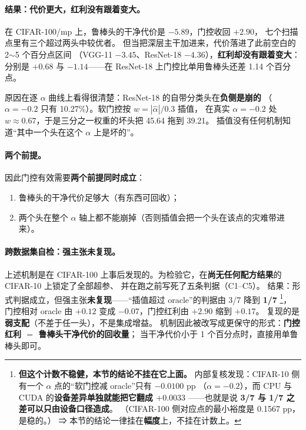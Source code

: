 \documentclass[11pt,a4paper]{ctexart}
\begin{document}
\paragraph{结果：代价更大，红利没有跟着变大。}
在 CIFAR-100/mp 上，鲁棒头的干净代价是 $-5.89$，门控收回 $+2.90$，
七个扫描点里有三个超过两头中较优者。
但当把深层主干加进来，代价落进了此前空白的 2$\sim$5 个百分点区间
（VGG-11 $-3.45$、ResNet-18 $-4.36$），\textbf{红利却没有跟着变大}：
分别是 $+0.68$ 与 $\mathbf{-1.14}$——在 ResNet-18 上门控比单用鲁棒头还差 1.14 个百分点。

原因在逐 $\alpha$ 曲线上看得很清楚：ResNet-18 的自带分类头在\textbf{负侧是崩的}
（$\alpha=-0.2$ 只有 10.27\%）。软门控按 $w=|\hat{\alpha}|/0.3$ 插值，
在真实 $\alpha=-0.2$ 处 $w\approx0.67$，于是三分之一权重的坏头把 45.64 拖到 39.21。
插值没有任何机制知道“其中一个头在这个 $\alpha$ 上是坏的”。

\paragraph{两个前提。}
因此门控有效需要\textbf{两个前提同时成立}：
\begin{enumerate}[leftmargin=2em,itemsep=2pt]
  \item 鲁棒头的干净代价足够大（有东西可回收）；
  \item 两个头在整个 $\alpha$ 轴上都不能崩掉（否则插值会把一个头在该点的灾难带进来）。
\end{enumerate}

\paragraph{跨数据集自检：强主张未复现。}
上述机制是在 CIFAR-100 上事后发现的。为检验它，在\textbf{尚无任何配方结果}的 CIFAR-10 上锁定了全部超参、
并在跑之前写死了五条判据（C1--C5）。
结果：形式判据成立，但强主张\textbf{未复现}——“插值超过 oracle”的判据由 3/7 降到 \textbf{1/7}
\footnote{\textbf{但这个计数不稳健，本节的结论不挂在它上面。}
内部复核发现：CIFAR-10 侧有一个 $\alpha$ 点的“软门控减 oracle”只有 $-0.0100$ pp
（$\alpha=-0.2$），而 CPU 与 CUDA 的\textbf{设备差异单独就能把它翻成 $+0.0033$}
——也就是说 \textbf{3/7 与 1/7 之差可以只由设备口径造成}。
（CIFAR-100 侧对应点的最小裕度是 0.1567 pp，是稳的。）
⇒ 本节的结论一律挂在\textbf{幅度}上，不挂在计数上。}，
门控相对 oracle 由 $+0.12$ 变成 $-0.07$，门控红利由 $+2.90$ 缩到 $+0.17$。
复现的是\textbf{弱支配}（不差于任一头），不是集成增益。
机制因此被改写成更保守的形式：\textbf{门控红利 $=$ 鲁棒头干净代价的回收量}；
当干净代价小于 1 个百分点时，直接用单鲁棒头即可。
\end{document}
